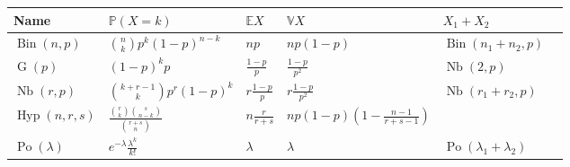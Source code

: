 \documentclass[a4paper,8pt]{article}
\theoremstyle{nonumberbreak}
\DeclareMathOperator{\Bin}{Bin}
\DeclareMathOperator{\Hyp}{Hyp}
\DeclareMathOperator{\Po}{Po}
\DeclareMathOperator{\Nb}{Nb}
\DeclareMathOperator{\G}{G}
\renewcommand{\P}{\mathbb{P}}
\newcommand{\E}{\mathbb{E}}
\newcommand{\V}{\mathbb{V}}
\begin{document}
		\tiny
		\begin{tabular}{ | M{1.2cm} | M{2.2cm} | M{1cm} | M{2.7cm} | M{2cm} | N}
			\hline
			Name & $\P(X=k)$ & $\E X$ & $\V X$ & $X_1 + X_2$ & \\ \hline \hline
			$\Bin(n, p)$ & $\binom{n}{k}p^k(1-p)^{n-k}$ & $np$ & $np(1-p)$ & $\Bin(n_1+n_2, p)$ & \\ \hline
			$\G(p)$ & $(1-p)^kp$ & $\frac{1-p}{p}$ & $\frac{1-p}{p^2}$ & $\Nb(2, p)$ & \\ \hline
			$\Nb(r, p)$ & $\binom{k+r-1}{k}p^r(1-p)^k$ & $r\frac{1-p}{p}$ & $r\frac{1-p}{p^2}$ & $\Nb(r_1 + r_2, p)$ & \\ \hline
			$\Hyp(n, r, s)$ & $\frac{\binom{r}{k}\binom{s}{n-k}}{\binom{r+s}{n}}$ & $n\frac{r}{r+s}$ & $np(1-p)\left(1-\frac{n-1}{r+s-1}\right)$ & & \\ \hline
			$\Po(\lambda)$ & $e^{-\lambda}\frac{\lambda^k}{k!}$ & $\lambda$ & $\lambda$ & $\Po(\lambda_1 + \lambda_2)$ & \\ \hline
		\end{tabular}
\end{document}
